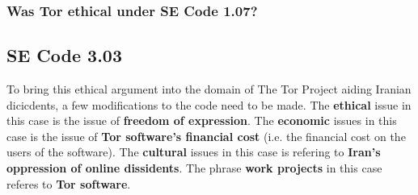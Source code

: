 \documentclass[11pt]{article}
\begin{document}
\begin{multicols}{2}

\subsubsection{Was Tor ethical under SE Code 1.07?}






\subsection{SE Code 3.03}

\newline

To bring this ethical argument into the domain of The Tor Project aiding Iranian
dicicdents, a few modifications to the code need to be made. The
\textbf{ethical} issue in this case is the issue of \textbf{freedom of
expression}. The \textbf{economic} issues in this case is the issue of
\textbf{Tor software's financial cost} (i.e. the financial cost on the users of
the software). The \textbf{cultural} issues in this case is refering to
\textbf{Iran's oppression of online dissidents}. The phrase \textbf{work
projects} in this case referes to \textbf{Tor software}.


\end{multicols}
\end{document}
